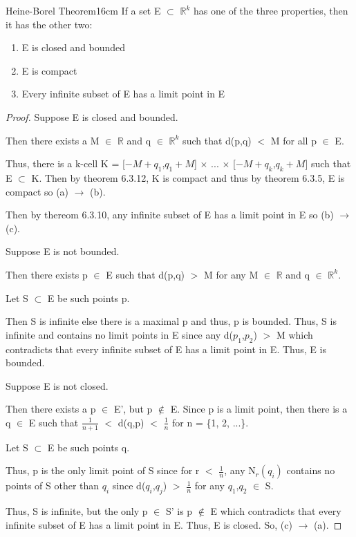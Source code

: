 	\newpage



	\begin{wtheorem}{Heine-Borel Theorem}{16cm}
		If a set E $\subset$ $\mathbb{R}^k$ has one of the three properties,
		then it has the other two:
	\end{wtheorem}

	\begin{enumerate}[label=(\alph*), leftmargin=2cm, itemsep=0.1cm]
		\item E is closed and bounded
		\item E is compact
		\item Every infinite subset of E has a limit point in E
	\end{enumerate}

	\begin{proof}
		Suppose E is closed and bounded.

		Then there exists a M $\in$ $\mathbb{R}$ and q $\in$ $\mathbb{R}^k$
		such that d(p,q) $<$ M for all p $\in$ E.
		
		Thus, there is a k-cell
		K = [$-M+q_1$,$q_1+M$] $\times$ ... $\times$ [$-M+q_k$,$q_k+M$]
		such that E $\subset$ K.
		Then by {\color{red} theorem 6.3.12}, K is compact
		and thus by {\color{red} theorem 6.3.5}, E is compact
		so (a) $\rightarrow$ (b).

		Then by {\color{red} thereom 6.3.10}, any infinite subset
		of E has a limit point in E so (b) $\rightarrow$ (c).

		Suppose E is not bounded.

		Then there exists p $\in$ E such that d(p,q) $>$ M for
		any M $\in$ $\mathbb{R}$ and q $\in$ $\mathbb{R}^k$.

		Let S $\subset$ E be such points p.
		
		Then S is infinite else there is a maximal p and thus,
		p is bounded.
		Thus, S is infinite and contains no limit points in E
		since any d($p_1$,$p_2$) $>$ M which contradicts that
		every infinite subset of E has a limit point in E.
		Thus, E is bounded.

		Suppose E is not closed.

		Then there exists a p $\in$ E', but p $\not \in$ E.
		Since p is a limit point, then there is a
		q $\in$ E such that $\frac{1}{n+1}$ $<$ d(q,p) $<$ $\frac{1}{n}$
		for n = \{1, 2, ...\}.

		Let S $\subset$ E be such points q.

		Thus, p is the only limit point of S since for r $<$ $\frac{1}{n}$,
		any N$_r(q_i)$ contains no points of S other than $q_i$ since
		d($q_i$,$q_j$) $>$ $\frac{1}{n}$ for any $q_1$,$q_2$ $\in$ S.
		
		Thus, S is infinite, but the only p $\in$ S' is p $\not \in$ E
		which contradicts that every infinite subset of E has a
		limit point in E. Thus, E is closed. So, (c) $\rightarrow$ (a).
	\end{proof}

